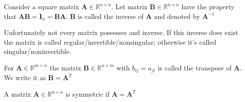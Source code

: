 \begin{definition}[Inverse]
    Consider a square matrix $\mathbf{A} \in \mathbb{R}^{n\times n}$. Let matrix $\mathbf{B} \in \mathbb{R}^{n\times n}$ have the property that $\mathbf{AB} = \mathbf{I}_n = \mathbf{BA}$. $\mathbf{B}$ is called the inverse of $\mathbf{A}$ and denoted by $\mathbf{A}^{-1}$
\end{definition}
Unfortunately not every matrix possesses and inverse. If this inverse does exist the matrix is called regular/invertible/nonsingular; otherwise it's called singular/noninvertible.
\begin{definition}[Transpose]
    For $\mathbf{A} \in \mathbb{R}^{m\times n}$ the matrix $\mathbf{B} \in \mathbb{R}^{n\times m}$ with $b_{ij}= a_{ji}$ is called the transpose of $\mathbf{A}$. We write it as $\mathbf{B} = \mathbf{A}^T$
\end{definition}
\begin{definition}
    A matrix $\mathbf{A} \in \mathbb{R}^{n\times n}$ is symmetric if $\mathbf{A} = \mathbf{A}^T$
\end{definition}
